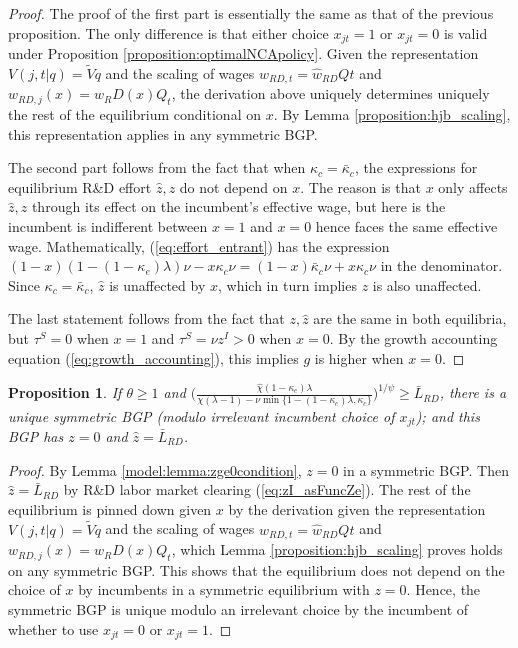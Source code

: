 \documentclass[11pt,english]{article}
\newtheorem{proposition}{Proposition}
\begin{document}
\begin{proof}
	The proof of the first part is essentially the same as that of the previous proposition. The only difference is that either choice $x_{jt} = 1$ or $x_{jt} = 0$ is valid under Proposition \ref{proposition:optimalNCApolicy}. Given the representation $V(j,t|q) = \tilde{V}q$ and the scaling of wages $\hat{w}_{RD,t} = \hat{w}_{RD}Qt$ and $w_{RD,j}(x) = w_RD(x) Q_t$, the derivation above uniquely determines uniquely the rest of the equilibrium conditional on $x$. By Lemma \ref{proposition:hjb_scaling}, this representation applies in any symmetric BGP. 
	
	The second part follows from the fact that when $\kappa_c = \bar{\kappa}_c$, the expressions for equilibrium R\&D effort $\hat{z},z$ do not depend on $x$. The reason is that $x$ only affects $\hat{z},z$ through its effect on the incumbent's effective wage, but here is the incumbent is indifferent between $x = 1$ and $x = 0$ hence faces the same effective wage. Mathematically, (\ref{eq:effort_entrant}) has the expression $(1-x)(1-(1-\kappa_e)\lambda)\nu - x \kappa_c \nu = (1-x) \bar{\kappa}_c \nu + x \kappa_c \nu$ in the denominator. Since $\kappa_c = \bar{\kappa}_c$, $\hat{z}$ is unaffected by $x$, which in turn implies $z$ is also unaffected.
	
	The last statement follows from the fact that $z,\hat{z}$ are the same in both equilibria, but $\tau^S = 0$ when $x = 1$ and $\tau^S = \nu z^I > 0$ when $x = 0$. By the growth accounting equation (\ref{eq:growth_accounting}), this implies $g$ is higher when $x = 0$. 
\end{proof}

\begin{proposition}\label{proposition:purstrategyeq:zeroOI}
	If $\theta \ge 1$ and $\Big( \frac{\hat{\chi} (1-\kappa_{e}) \lambda}{\chi(\lambda-1) - \nu \min\{ 1-(1-\kappa_e) \lambda, \kappa_c \}} \Big)^{1/\psi} \ge \bar{L}_{RD}$, there is a unique symmetric BGP (modulo irrelevant incumbent choice of $x_{jt}$); and this BGP has $z = 0$ and $\hat{z} = \bar{L}_{RD}$.
\end{proposition}

\begin{proof}
	By Lemma \ref{model:lemma:zge0condition}, $z = 0$ in a symmetric BGP. Then $\hat{z} = \bar{L}_{RD}$ by R\&D labor market clearing (\ref{eq:zI_asFuncZe}). The rest of the equilibrium is pinned down given $x$ by the derivation given the representation $V(j,t|q) = \tilde{V}q$ and the scaling of wages $\hat{w}_{RD,t} = \hat{w}_{RD}Qt$ and $w_{RD,j}(x) = w_RD(x) Q_t$, which Lemma \ref{proposition:hjb_scaling} proves holds on any symmetric BGP. This shows that the equilibrium does not depend on the choice of $x$ by incumbents in a symmetric equilibrium with $z = 0$. Hence, the symmetric BGP is unique modulo an irrelevant choice by the incumbent of whether to use $x_{jt} = 0$ or $x_{jt} = 1$. 
\end{proof}
\end{document}
